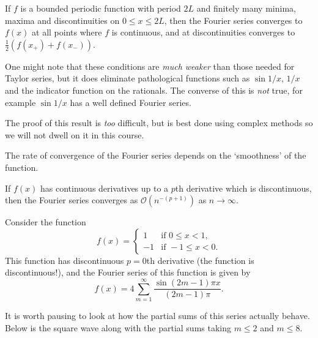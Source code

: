 \begin{theorem}
    If $f$ is a bounded periodic function with period $2L$ and finitely many minima, maxima and discontinuities on $0 \leq x \leq 2L$, then the Fourier series converges to $f(x)$ at all points where $f$ is continuous, and at discontinuities converges to $\frac{1}{2}(f(x_+) + f(x_-))$.
\end{theorem}

One might note that these conditions are \emph{much weaker} than those needed for Taylor series, but it does eliminate pathological functions such as $\sin 1/x$, $1/x$ and the indicator function on the rationals.
The converse of this is \emph{not} true, for example $\sin 1/x$ has a well defined Fourier series.

The proof of this result is \emph{too} difficult, but is best done using complex methods so we will not dwell on it in this course.

The rate of convergence of the Fourier series depends on the `smoothness' of the function.

\begin{theorem}
If $f(x)$ has continuous derivatives up to a $p$th derivative which is discontinuous, then the Fourier series converges as $\mathcal{O}(n^{-(p + 1)})$ as $n \rightarrow \infty$.
\end{theorem}

\begin{example}\label{ex:square}
    Consider the function
    $$
    f(x) = \begin{cases}
        1 &\mbox{if } 0 \leq x < 1, \\
        -1 &\mbox{if } -1 \leq x < 0.
       \end{cases}
    $$
    This function has discontinuous $p = 0$th derivative (the function is discontinuous!), and the Fourier series of this function is given by
    $$
    f(x) = 4 \sum_{m=1}^{\infty} \frac{\sin (2 m-1) \pi x}{(2 m-1) \pi}.
    $$
\end{example}

It is worth pausing to look at how the partial sums of this series actually behave. Below is the square wave along with the partial sums taking $m \leq 2$ and $m \leq 8$.

